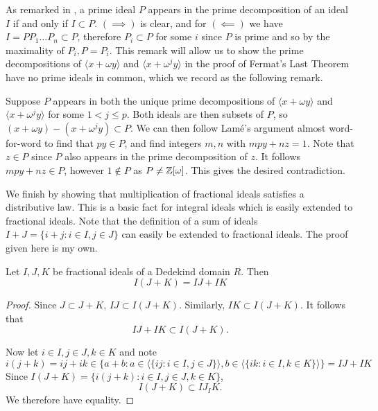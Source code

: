As remarked in \cite{Wright}, a prime ideal $P$ appears in the prime decomposition of an ideal $I$ if and only if $I\subset P$. $(\implies)$ is clear, and for $(\impliedby)$ we have $I=PP_1\dots P_n\subset P$, therefore $P_i\subset P$ for some $i$ since $P$ is prime and so by the maximality of $P_i, P=P_i$. This remark will allow us to show the prime decompositions of $\langle x +\omega y\rangle$ and $\langle x +\omega^j y\rangle$ in the proof of Fermat's Last Theorem have no prime ideals in common, which we record as the following remark.

\begin{remark}\label{Dedekind-returns-to-type-1}
Suppose $P$ appears in both the unique prime decompositions of $\langle x +\omega y\rangle$ and $\langle x +\omega^j y\rangle$ for some $1<j\leq p$. Both ideals are then subsets of $P$, so $(x+\omega y)-(x+\omega^j y)\subset P$. We can then follow Lamé's argument almost word-for-word to find that $py\in P$, and find integers $m,n$ with $mpy+nz=1$. Note that $z\in P$ since $P$ also appears in the prime decomposition of $z$. It follows $mpy+nz\in P$, however $1\not \in P $ as $P\neq \mathbb{Z}[\omega]$. This gives the desired contradiction. \cite{Wright} 
\end{remark}

We finish by showing that multiplication of fractional ideals satisfies a distributive law. This is a basic fact for integral ideals which is easily extended to fractional ideals. Note that the definition of a sum of ideals $I+J=\{i+j:i\in I, j\in J\}$ can easily be extended to fractional ideals. The proof given here is my own.

\begin{lemma}\label{distributive-law-for-ideals}
Let $I,J,K$ be fractional ideals of a Dedekind domain $R$. Then $$I(J+K)=IJ+IK$$
\end{lemma}
\begin{proof}
Since $J\subset J+K$, $IJ\subset I(J+K)$. Similarly, $IK\subset I(J+K)$. It follows that $$IJ+IK\subset I(J+K).$$

Now let $i\in I, j\in J, k\in K$ and note $$i(j+k)=ij+ik\in\{a+b:a\in \langle \{ij:i\in I, j\in J\}\rangle,b\in \langle \{ik:i\in I, k\in K\}\rangle \}=IJ+IK$$
Since $I(J+K)=\{i(j+k):i\in I, j\in J, k\in K\}$, $$I(J+K)\subset IJ_IK.$$ We therefore have equality.
\end{proof}